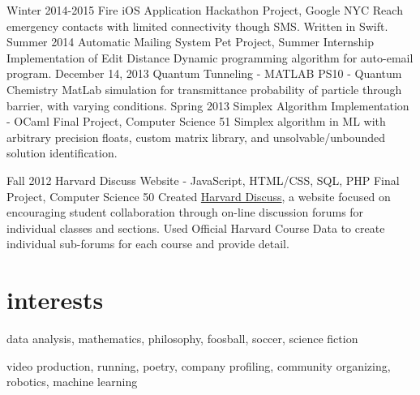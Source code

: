 \documentclass[]{friggeri-cv} %
\begin{document}
\entry
{Winter 2014-2015}
{Fire iOS Application}
{Hackathon Project, Google NYC}
{Reach emergency contacts with limited connectivity though SMS. Written in Swift.}
\entry
{Summer 2014}
{Automatic Mailing System}
{Pet Project, Summer Internship}
{Implementation of Edit Distance Dynamic programming algorithm for auto-email program.}
\entry
{December 14, 2013}
{Quantum Tunneling - MATLAB}
{PS10 - Quantum Chemistry}
{MatLab simulation for transmittance probability of particle through barrier, with varying conditions.}
\entry
{Spring 2013}
{Simplex Algorithm Implementation - OCaml}
{Final Project, Computer Science 51}
{Simplex algorithm in ML with arbitrary precision floats, custom matrix library, and unsolvable/unbounded solution identification.}
\begin{detailed}
\entry
{Fall 2012}
{Harvard Discuss Website - JavaScript, HTML/CSS, SQL, PHP}
{Final Project, Computer Science 50}
{Created \href{https://www.hcs.harvard.edu/~harvarddiscuss/index.php/en/}{Harvard Discuss}, a website focused on encouraging student collaboration through on-line discussion forums for individual classes and sections. Used Official Harvard Course Data to create individual sub-forums for each course and provide detail.}
\end{detailed}

\section{interests}
data analysis, mathematics, philosophy, foosball, soccer, science fiction
\begin{detailed} 
video production, running, poetry, company profiling,  community organizing, robotics, machine learning
\end{detailed}

\end{document}
